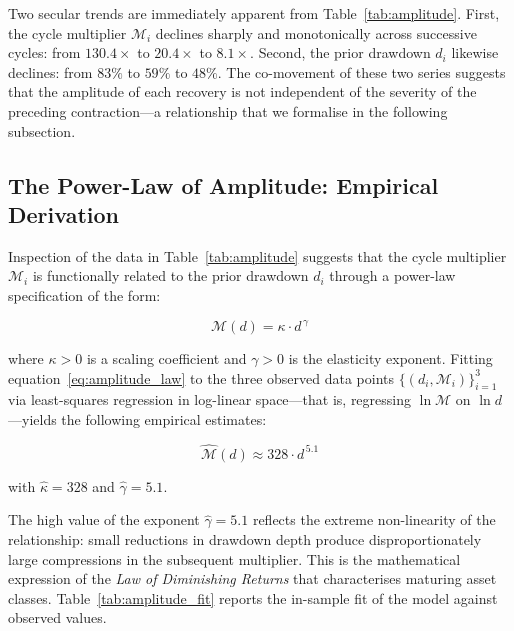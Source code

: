 Two secular trends are immediately apparent from Table~\ref{tab:amplitude}.
First, the cycle multiplier $\mathcal{M}_i$ declines sharply and
monotonically across successive cycles: from $130.4\times$ to $20.4\times$
to $8.1\times$. Second, the prior drawdown $d_i$ likewise declines: from $83\%$
to $59\%$ to $48\%$. The co-movement of these two series suggests that the
amplitude of each recovery is not independent of the severity of the preceding
contraction---a relationship that we formalise in the following subsection.

\subsection{The Power-Law of Amplitude: Empirical Derivation}

Inspection of the data in Table~\ref{tab:amplitude} suggests that the cycle
multiplier $\mathcal{M}_i$ is functionally related to the prior drawdown $d_i$
through a power-law specification of the form:

\begin{equation}
  \mathcal{M}(d) = \kappa \cdot d^{\,\gamma}
  \label{eq:amplitude_law}
\end{equation}

where $\kappa > 0$ is a scaling coefficient and $\gamma > 0$ is the elasticity
exponent. Fitting equation~\eqref{eq:amplitude_law} to the three observed
data points $\{(d_i, \mathcal{M}_i)\}_{i=1}^{3}$ via least-squares regression
in log-linear space---that is, regressing $\ln\mathcal{M}$ on $\ln d$---yields
the following empirical estimates:

\begin{equation}
  \boxed{\ \hat{\mathcal{M}}(d) \approx 328 \cdot d^{\,5.1}\ }
  \label{eq:amplitude_fit}
\end{equation}

with $\hat{\kappa} = 328$ and $\hat{\gamma} = 5.1$.

The high value of the exponent $\hat{\gamma} = 5.1$ reflects the extreme
non-linearity of the relationship: small reductions in drawdown depth produce
disproportionately large compressions in the subsequent multiplier. This is
the mathematical expression of the \textit{Law of Diminishing Returns} that
characterises maturing asset classes. Table~\ref{tab:amplitude_fit} reports
the in-sample fit of the model against observed values.

